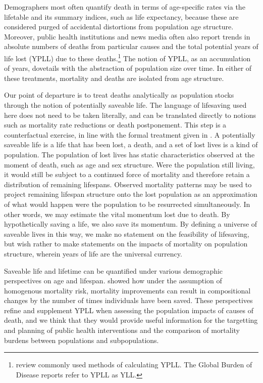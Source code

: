 \documentclass{article}
\begin{document}
Demographers most often quantify death in terms of age-specific rates via the
lifetable and its summary indices, such as life expectancy, because these are
considered purged of accidental distortions from population age structure. Moreover, public health
institutions and news media often also report trends in absolute numbers of
deaths from particular causes and the total potential years of life lost (YPLL)
due to these deaths.\footnote{\citet{gardner1990} review commonly used methods
of calculating YPLL. The Global Burden of Disease reports refer to YPLL as YLL.}
The notion of YPLL, as an accumulation of years, dovetails with the
abstraction of population size over time.
In either of these treatments, mortality and deaths are isolated from age structure.

Our point of departure is to
treat deaths analytically as population stocks through the notion of
potentially saveable life. The language of lifesaving
used here does not need to be taken literally, and can be translated directly to
notions such as mortality rate reductions or death postponement. This step is a
counterfactual exercise, in line with the formal treatment given in \citet{vaupel1987repeated}. A potentially saveable life is a life that
has been lost, a death, and a set of lost lives is a kind of population. The
population of lost lives has static characteristics observed at the moment of
death, such as age and sex structure. Were the
population still living, it would still be subject to a continued force of
mortality and therefore retain a distribution of remaining lifespans.
Observed mortality patterns may be used to project remaining lifespan structure onto the lost population as an approximation of what would
happen were the population to be resurrected simultaneously. In other words, we
may estimate the vital momentum lost due to death. By hypothetically saving a
life, we also save its momentum. By defining a universe of saveable lives in
this way, we make no statement on the feasibility of lifesaving, but wish
rather to make statements on the impacts of mortality on population structure,
wherein years of life are the universal currency. 

Saveable life and lifetime can be quantified under various demographic
perspectives on age and lifespan. \citet{vaupel1987repeated} showed how under
the assumption of homogenous mortality risk, mortality improvements can result
in compositional changes by the number of times individuals have been saved.
These perspectives refine and supplement YPLL when assessing the population impacts of causes of death, and we think that they would provide useful information for the targetting and planning of public health interventions and the comparison of mortality burdens between populations and subpopulations.
\end{document}
